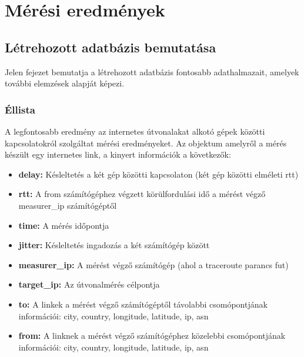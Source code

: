 \chapter{Mérési eredmények}




\section{Létrehozott adatbázis bemutatása}
Jelen fejezet bemutatja a létrehozott adatbázis fontosabb adathalmazait, amelyek további elemzések alapját képezi.

\subsection*{Éllista}
A legfontosabb eredmény az internetes útvonalakat alkotó gépek közötti kapcsolatokról szolgáltat mérési eredményeket. Az objektum amelyről a mérés készült egy internetes link, a kinyert információk a következők:

\begin{itemize}
\item \textbf{delay:} Késleltetés a két gép közötti kapcsolaton (két gép közötti elméleti rtt)
\item \textbf{rtt:} A from számítógéphez végzett körülfordulási idő a mérést végző measurer\_ip számítógéptől
\item \textbf{time:} A mérés időpontja
\item \textbf{jitter:} Késleltetés ingadozás a két számítógép között
\item \textbf{measurer\_ip:} A mérést végző számítógép (ahol a traceroute parancs fut)
\item \textbf{target\_ip:} Az útvonalmérés célpontja
\item \textbf{to:} A linkek a mérést végző számítógéptől távolabbi csomópontjának információi: city, country, longitude, latitude, ip, asn
\item \textbf{from:} A linknek a mérést végző számítógéphez közelebbi csomópontjának információi: city, country, longitude, latitude, ip, asn
\end{itemize}



